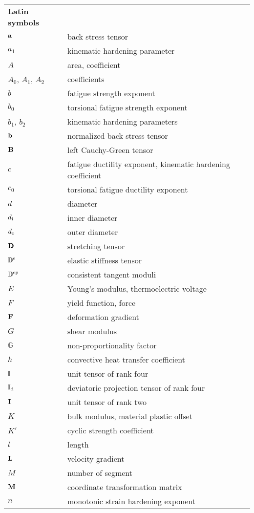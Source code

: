 \begin{table}[htb]
  \centering
    \begin{tabular}{p{3cm}p{10.5cm}}
    \textbf{Latin symbols} & \\
    $\bf{a}$ & back stress tensor \\
    $a_1$ & kinematic hardening parameter \\
    $A$ & area, coefficient \\
    $A_0$, $A_1$, $A_2$ & coefficients \\
    $b$ & fatigue strength exponent \\
    $b_0$ & torsional fatigue strength exponent \\
    $b_1$, $b_2$ & kinematic hardening parameters \\
    $\bf{b}$ & normalized back stress tensor \\
    $\bf{B}$ & left Cauchy-Green tensor \\
    $c$ & fatigue ductility exponent, kinematic hardening coefficient \\
    $c_0$ & torsional fatigue ductility exponent \\
    $d$  & diameter \\
    $d_{\rm i}$  & inner diameter \\
    $d_{\rm o}$  & outer diameter \\
    $\bf{D}$ & stretching tensor \\
    $\mathbb{D}^{\rm{e}}$ & elastic stiffness tensor \\
    $\mathbb{D}^{\rm{ep}}$ & consistent tangent moduli \\
    $E$   & Young's modulus, thermoelectric voltage \\
    $F$   & yield function, force \\
    $\bf{F}$ & deformation gradient \\
    $G$   & shear modulus \\
    $\mathbb{G}$ & non-proportionality factor \\
    $h$ & convective heat transfer coefficient \\
    $\mathbb{I}$ & unit tensor of rank four \\
    $\mathbb{I}_{\rm{d}}$ & deviatoric projection tensor of rank four \\
    $\bf{I}$ & unit tensor of rank two \\
    $K$ & bulk modulus, material plastic offset \\
    $K'$ & cyclic strength coefficient \\
    $l$ & length \\
    $\bf{L}$ & velocity gradient \\
    $M$ & number of segment \\
    $\bf{M}$ & coordinate transformation matrix \\
    $n$ & monotonic strain hardening exponent \\
    \end{tabular}%
  \label{Tab:latin_1}%
\end{table}%


